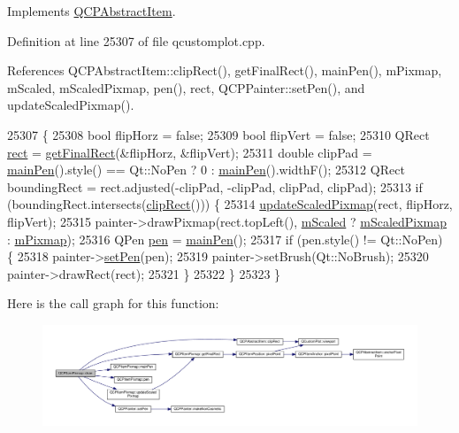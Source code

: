 Implements \hyperlink{class_q_c_p_abstract_item_ad0dc056f650c3ca73414e6b4f01674ef}{Q\+C\+P\+Abstract\+Item}.



Definition at line 25307 of file qcustomplot.\+cpp.



References Q\+C\+P\+Abstract\+Item\+::clip\+Rect(), get\+Final\+Rect(), main\+Pen(), m\+Pixmap, m\+Scaled, m\+Scaled\+Pixmap, pen(), rect, Q\+C\+P\+Painter\+::set\+Pen(), and update\+Scaled\+Pixmap().


\begin{DoxyCode}
25307                                             \{
25308   \textcolor{keywordtype}{bool} flipHorz = \textcolor{keyword}{false};
25309   \textcolor{keywordtype}{bool} flipVert = \textcolor{keyword}{false};
25310   QRect \hyperlink{_gen_blob_8m_aea8f6815d9a63491fc422c5572c6b3c3}{rect} = \hyperlink{class_q_c_p_item_pixmap_a245ef0c626cab7096a810442f2f6a2d9}{getFinalRect}(&flipHorz, &flipVert);
25311   \textcolor{keywordtype}{double} clipPad = \hyperlink{class_q_c_p_item_pixmap_af21085516585c475dc9d839e7f377233}{mainPen}().style() == Qt::NoPen ? 0 : \hyperlink{class_q_c_p_item_pixmap_af21085516585c475dc9d839e7f377233}{mainPen}().widthF();
25312   QRect boundingRect = rect.adjusted(-clipPad, -clipPad, clipPad, clipPad);
25313   \textcolor{keywordflow}{if} (boundingRect.intersects(\hyperlink{class_q_c_p_abstract_item_a538e25ff8856534582f5b2b400a46405}{clipRect}())) \{
25314     \hyperlink{class_q_c_p_item_pixmap_a8bced3027b326b290726cd1979c7cfc6}{updateScaledPixmap}(rect, flipHorz, flipVert);
25315     painter->drawPixmap(rect.topLeft(), \hyperlink{class_q_c_p_item_pixmap_a8fe670a529cd46a9b8afd9fc1203bc3f}{mScaled} ? \hyperlink{class_q_c_p_item_pixmap_a2ebc66e15b9f1264563d58f29ba1bc00}{mScaledPixmap} : 
      \hyperlink{class_q_c_p_item_pixmap_a1396cce7f26c7b8e9512906284380c4d}{mPixmap});
25316     QPen \hyperlink{class_q_c_p_item_pixmap_ab2b821c80cfade589472e933b9c4361f}{pen} = \hyperlink{class_q_c_p_item_pixmap_af21085516585c475dc9d839e7f377233}{mainPen}();
25317     \textcolor{keywordflow}{if} (pen.style() != Qt::NoPen) \{
25318       painter->\hyperlink{class_q_c_p_painter_af9c7a4cd1791403901f8c5b82a150195}{setPen}(pen);
25319       painter->setBrush(Qt::NoBrush);
25320       painter->drawRect(rect);
25321     \}
25322   \}
25323 \}
\end{DoxyCode}


Here is the call graph for this function\+:\nopagebreak
\begin{figure}[H]
\begin{center}
\leavevmode
\includegraphics[width=350pt]{class_q_c_p_item_pixmap_a879e8076c2db01a38b34cfa73ec95d2f_cgraph}
\end{center}
\end{figure}


